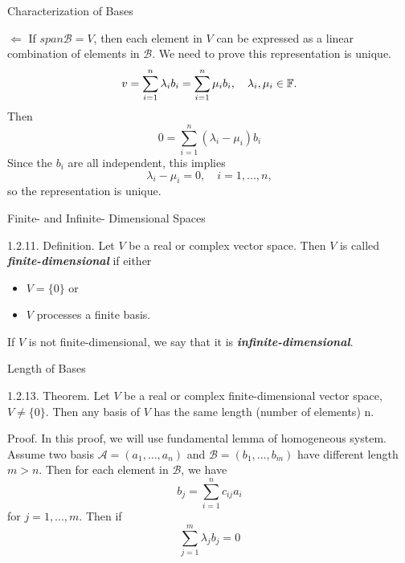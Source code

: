 \documentclass[hyperref={pdfpagelabels=true}]{beamer}
\newcommand{\highlightg}[1]{\textcolor[rgb]{0.1,0.5,0.3}{\emph{\textbf{#1}}}}
\newcommand{\structb}[1]{\textcolor[rgb]{0.2,0.2,0.7}{#1}}
\newcommand{\<}{\langle}
\renewcommand{\>}{\rangle}
\begin{document}
\begin{frame}{Characterization of Bases}
    \begin{block}{}
        \structb{$\Leftarrow$} If $span\mathcal{B} = V$, then each element in $V$ can be expressed as a linear combination of elements in $\mathcal{B}$. We need to prove this representation is unique. 
        \[v = \sum_{i = 1}^{n}\lambda_{i}b_{i} = \sum_{i = 1}^{n} \mu_{i}b_{i}, \quad \lambda_{i},\mu_{i} \in \mathbb{F}.\]
        Then 
        \[ 0 = \sum_{i = 1}^{n}(\lambda_{i}-\mu_{i})b_{i} \]
        Since the $b_{i}$ are all independent, this implies
        \[\lambda_{i}-\mu_{i} = 0, \quad i = 1,...,n,\]
        so the representation is unique.
    \end{block}
\end{frame}
\begin{frame}{Finite- and Infinite- Dimensional Spaces}
    \begin{block}{1.2.11. Definition.}
        Let $V$ be a real or complex vector space. Then $V$ is called \highlightg{finite-dimensional} if either
        \begin{itemize}
            \item $V = \{0\}$ or
            \item $V$ processes a finite basis.
        \end{itemize}
        If $V$ is not finite-dimensional, we say that it is \highlightg{infinite-dimensional}.
    \end{block}
\end{frame}
\begin{frame}{Length of Bases}
    \begin{block}{1.2.13. Theorem.}
        Let $V$ be a real or complex finite-dimensional vector space, $V \neq \{0\}$. Then any basis of $V$ has the same length (number of elements) n.
    \end{block}
    \begin{block}{Proof.}
        In this proof, we will use fundamental lemma of homogeneous system.\\
        Assume two basis $\mathcal{A} = (a_1,...,a_n)$ and $\mathcal{B} = (b_1,...,b_m)$ have different length $m > n$. Then for each element in $\mathcal{B}$, we have
        \[b_{j} = \sum_{i = 1}^{n}c_{ij}a_{i}\]
        for $j = 1,...,m$. Then if
        \[\sum_{j = 1}^{m}\lambda_{j}b_{j} = 0\]
    \end{block}
\end{frame}
\end{document}
